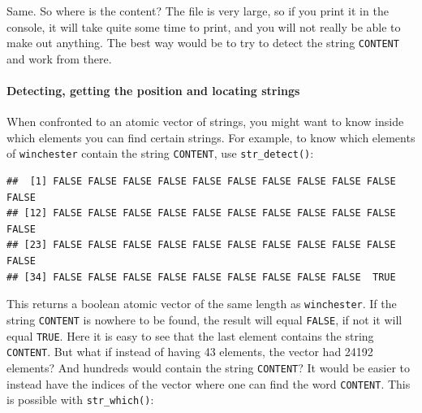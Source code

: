 \documentclass[]{gitbook}
\newenvironment{Shaded}{\begin{snugshade}}{\end{snugshade}}
\newcommand{\KeywordTok}[1]{\textcolor[rgb]{0.13,0.29,0.53}{\textbf{#1}}}
\newcommand{\NormalTok}[1]{#1}
\newcommand{\OperatorTok}[1]{\textcolor[rgb]{0.81,0.36,0.00}{\textbf{#1}}}
\newcommand{\StringTok}[1]{\textcolor[rgb]{0.31,0.60,0.02}{#1}}
\let\oldparagraph\paragraph
\renewcommand{\paragraph}[1]{\oldparagraph{#1}\mbox{}}
\begin{document}
Same. So where is the content? The file is very large, so if you print it in the console, it will
take quite some time to print, and you will not really be able to make out anything. The best
way would be to try to detect the string \texttt{CONTENT} and work from there.

\hypertarget{detecting-getting-the-position-and-locating-strings}{%
\paragraph{Detecting, getting the position and locating strings}\label{detecting-getting-the-position-and-locating-strings}}

When confronted to an atomic vector of strings, you might want to know inside which elements you
can find certain strings. For example, to know which elements of \texttt{winchester} contain the string
\texttt{CONTENT}, use \texttt{str\_detect()}:

\begin{Shaded}
\end{Shaded}

\begin{verbatim}
##  [1] FALSE FALSE FALSE FALSE FALSE FALSE FALSE FALSE FALSE FALSE FALSE
## [12] FALSE FALSE FALSE FALSE FALSE FALSE FALSE FALSE FALSE FALSE FALSE
## [23] FALSE FALSE FALSE FALSE FALSE FALSE FALSE FALSE FALSE FALSE FALSE
## [34] FALSE FALSE FALSE FALSE FALSE FALSE FALSE FALSE FALSE  TRUE
\end{verbatim}

This returns a boolean atomic vector of the same length as \texttt{winchester}. If the string \texttt{CONTENT} is
nowhere to be found, the result will equal \texttt{FALSE}, if not it will equal \texttt{TRUE}. Here it is easy to
see that the last element contains the string \texttt{CONTENT}. But what if instead of having 43 elements,
the vector had 24192 elements? And hundreds would contain the string \texttt{CONTENT}? It would be easier
to instead have the indices of the vector where one can find the word \texttt{CONTENT}. This is possible
with \texttt{str\_which()}:

\begin{Shaded}
\end{Shaded}
\end{document}
